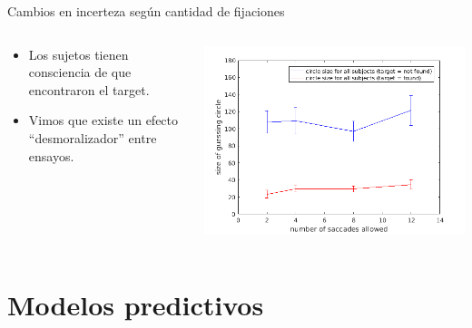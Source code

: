 \documentclass[compress]{beamer}
\begin{document}


\begin{frame}{Cambios en incerteza según cantidad de fijaciones}
\centering
  \begin{columns}[T]
    \begin{column}{.4\textwidth}
        \vspace{1.3cm}
        \begin{itemize}
        \item Los sujetos tienen consciencia de que encontraron el target.
        \item Vimos que existe un efecto ``desmoralizador'' entre ensayos.
        \end{itemize}
    \end{column}
    \begin{column}{.6\textwidth}
        \begin{center}
        \centering
        \includegraphics[width=\linewidth]{images/mean_circle_size.png}
        \end{center}
    \end{column}
  \end{columns}
\end{frame}

\section{Modelos predictivos}
\end{document}
